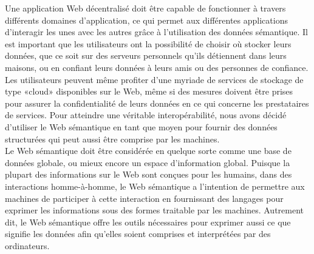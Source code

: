 Une application Web décentralisé doit être capable de fonctionner à travers différents domaines d'application, ce qui permet aux différentes applications d'interagir les unes avec les autres grâce à l'utilisation des données sémantique. Il est important que les utilisateurs ont la possibilité de choisir où stocker leurs données, que ce soit sur des serveurs personnels qu'ils détiennent dans leurs maisons, ou en confiant leurs données à leurs amis ou des personnes de confiance. Les utilisateurs peuvent même profiter d'une myriade de  services de stockage de type «cloud» disponibles sur le Web, même si des mesures doivent être prises pour assurer la confidentialité de leurs données en ce qui concerne les prestataires de services. Pour atteindre une véritable interopérabilité, nous avons décidé d'utiliser le Web sémantique en tant que moyen pour fournir des données structurées qui peut aussi être comprise par les machines.\\


Le Web sémantique doit être considérée en quelque sorte comme une base de données globale, ou mieux encore un espace d'information global.  Puisque la plupart des informations sur le Web sont conçues pour les humains, dans des interactions homme-à-homme, le Web sémantique a l'intention de permettre aux machines de participer à cette interaction en fournissant des langages pour exprimer les informations sous des formes traitable par les machines. Autrement dit, le Web sémantique offre les outils nécessaires pour exprimer aussi ce que signifie les données afin qu'elles soient comprises et interprétées par des ordinateurs.\\



